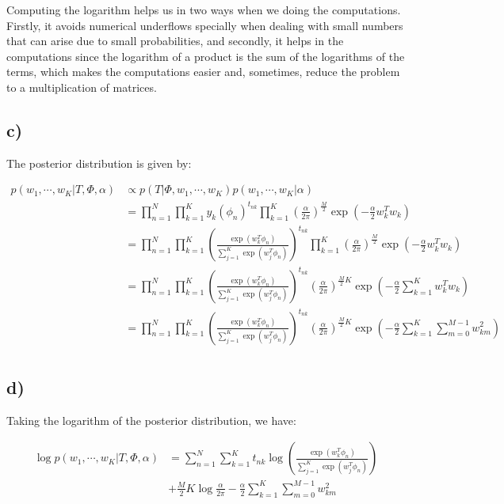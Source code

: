 \documentclass[12pt,a4paper,oneside]{paper}
\begin{document}
Computing the logarithm helps us in two ways when we doing the computations. Firstly, it avoids numerical
underflows specially when dealing with small numbers that can arise due to small probabilities, and secondly,
it helps in the computations since the logarithm of a product is the sum of the logarithms of the terms, which makes
the computations easier and, sometimes, reduce the problem to a multiplication of matrices.

\subsection{c)}

The posterior distribution is given by:

\begin{align*}
    p(w_1, \cdots, w_K | T, \Phi, \alpha) &\propto p(T | \Phi, w_1, \cdots, w_K) p(w_1, \cdots, w_K | \alpha) \\
    &= \prod_{n=1}^{N} \prod_{k=1}^{K} y_k(\phi_n)^{t_{nk}} \prod_{k=1}^{K} \left(\frac{\alpha}{2\pi}\right)^{\frac{M}{2}} \exp\left(-\frac{\alpha}{2} w_k^T w_k\right) \\
    &= \prod_{n=1}^{N} \prod_{k=1}^{K} \left(\frac{\exp(w_k^T \phi_n)}{\sum_{j=1}^{K} \exp(w_j^T \phi_n)}\right)^{t_{nk}} \prod_{k=1}^{K} \left(\frac{\alpha}{2\pi}\right)^{\frac{M}{2}} \exp\left(-\frac{\alpha}{2} w_k^T w_k\right) \\
    &= \prod_{n=1}^{N} \prod_{k=1}^{K} \left(\frac{\exp(w_k^T \phi_n)}{\sum_{j=1}^{K} \exp(w_j^T \phi_n)}\right)^{t_{nk}} \left(\frac{\alpha}{2\pi}\right)^{\frac{M}{2} K} \exp\left(-\frac{\alpha}{2} \sum_{k=1}^{K} w_k^T w_k\right) \\
    &= \prod_{n=1}^{N} \prod_{k=1}^{K} \left(\frac{\exp(w_k^T \phi_n)}{\sum_{j=1}^{K} \exp(w_j^T \phi_n)}\right)^{t_{nk}} \left(\frac{\alpha}{2\pi}\right)^{\frac{M}{2} K} \exp\left(-\frac{\alpha}{2} \sum_{k=1}^{K} \sum_{m=0}^{M - 1} w _{km}^2\right) \\
\end{align*}

\subsection{d)}

Taking the logarithm of the posterior distribution, we have:

\begin{align*}
    \log p(w_1, \cdots, w_K | T, \Phi, \alpha) &= \sum_{n=1}^{N} \sum_{k=1}^{K} t_{nk} \log \left(\frac{\exp(w_k^T \phi_n)}{\sum_{j=1}^{K} \exp(w_j^T \phi_n)}\right) \\
    &+ \frac{M}{2} K \log \frac{\alpha}{2\pi} - \frac{\alpha}{2} \sum_{k=1}^{K} \sum_{m=0}^{M - 1} w_{km}^2
\end{align*}
\end{document}
